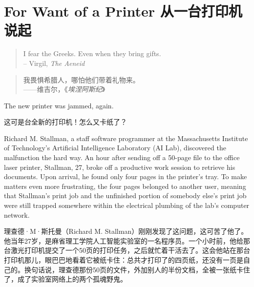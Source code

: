 \chapter{\ifdefined\eng
For Want of a Printer
\fi
\ifdefined\chs
从一台打印机说起
\fi
}
\thispagestyle{empty}
\ifdefined\eng
\begin{quotation}
  \begin{flushright}
    I fear the Greeks. Even when they bring gifts.\\
    -- Virgil, \textit{The Aeneid}
  \end{flushright}
\end{quotation}
\fi

\ifdefined\chs
\begin{quotation}
  \begin{flushright}
   我畏惧希腊人，哪怕他们带着礼物来。\\
    ——维吉尔，《\textit{埃涅阿斯纪}》
  \end{flushright}
\end{quotation}
\fi

\ifdefined\eng
The new printer was jammed, again.
\fi

\ifdefined\chs
这可是台全新的打印机！怎么又卡纸了？
\fi

\ifdefined\eng
Richard M. Stallman, a staff software programmer at the Massachusetts Institute of Technology's Artificial Intelligence Laboratory (AI Lab), discovered the malfunction the hard way. An hour after sending off a 50-page file to the office laser printer, Stallman, 27, broke off a productive work session to retrieve his documents. Upon arrival, he found only four pages in the printer's tray. To make matters even more frustrating, the four pages belonged to another user, meaning that Stallman's print job and the unfinished portion of somebody else's print job were still trapped somewhere within the electrical plumbing of the lab's computer network.
\fi

\ifdefined\chs
理查德·M·斯托曼（Richard M. Stallman）刚刚发现了这问题，这可苦了他了。他当年27岁，是麻省理工学院人工智能实验室的一名程序员。一个小时前，他给那台激光打印机提交了一个50页的打印任务，之后就忙着干活去了。这会他站在那台打印机那儿，眼巴巴地看着它被纸卡住：总共才打印了的四页纸，还没有一页是自己的。换句话说，理查德那份50页的文件，外加别人的半份文档，全被一张纸卡住了，成了实验室网络上的两个孤魂野鬼。
\fi


